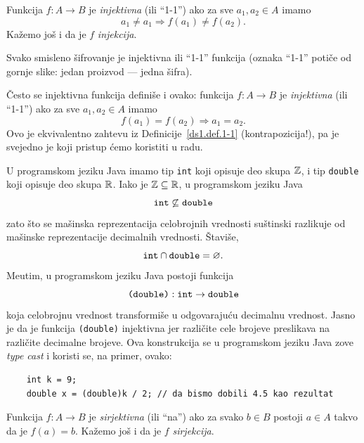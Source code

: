 \begin{DEF}\label{ds1.def.1-1}
  Funkcija $f : A \to B$ je \emph{injektivna} (ili \enquote{1-1}) ako za sve $a_1, a_2 \in A$ imamo
  $$
    a_1 \ne a_1 \Rightarrow f(a_1) \ne f(a_2).
  $$
  Ka\v zemo jo\v s i da je $f$ \emph{injekcija}.
\end{DEF}

\begin{EX}
  Svako smisleno \v sifrovanje je injektivna ili \enquote{1-1} funkcija (oznaka \enquote{1-1}
  poti\v ce od gornje slike: jedan proizvod --- jedna \v sifra).
\end{EX}

\v Cesto se injektivna funkcija defini\v se i ovako: funkcija
$f : A \to B$ je \emph{injektivna} (ili \enquote{1-1}) ako za sve $a_1, a_2 \in A$ imamo
$$
  f(a_1) = f(a_2) \Rightarrow a_1 = a_2.
$$
Ovo je ekvivalentno zahtevu iz Definicije~\ref{ds1.def.1-1} (kontrapozicija!), pa je
svejedno je koji pristup \'cemo koristiti u radu.


\begin{EX}
  U programskom jeziku Java imamo tip \verb`int` koji opisuje deo skupa $\mathbb{Z}$, i tip \verb`double` koji
  opisuje deo skupa $\mathbb{R}$. Iako je $\mathbb{Z} \subseteq \mathbb{R}$, u programskom jeziku Java
  $$
    \hbox{\texttt{int}} \not\subseteq \hbox{\texttt{double}}
  $$
  zato \v sto se ma\v sinska reprezentacija celobrojnih vrednosti su\v stinski razlikuje od ma\v sinske reprezentacije
  decimalnih vrednosti. \v Stavi\v se,
  $$
    \hbox{\texttt{int}} \cap \hbox{\texttt{double}} = \varnothing.
  $$
  Me\dj utim, u programskom jeziku Java postoji funkcija
  $$
    \hbox{\texttt{(double)}} : \hbox{\texttt{int}} \to \hbox{\texttt{double}}
  $$
  koja celobrojnu vrednost transformi\v se u odgovaraju\'cu decimalnu vrednost. Jasno je da je funkcija
  \verb`(double)` injektivna jer razli\v cite cele brojeve preslikava na razli\v cite decimalne brojeve.
  Ova konstrukcija se u programskom jeziku Java zove \emph{type cast} i koristi se, na primer, ovako:
  {\small
\begin{verbatim}
    int k = 9;
    double x = (double)k / 2; // da bismo dobili 4.5 kao rezultat
\end{verbatim}
  }
\end{EX}

\begin{DEF}
  Funkcija $f : A \to B$ je \emph{sirjektivna} (ili \enquote{na}) ako za svako $b \in B$ postoji
  $a \in A$ takvo da je $f(a) = b$. Ka\v zemo jo\v s i da je $f$ \emph{sirjekcija}.
\end{DEF}

